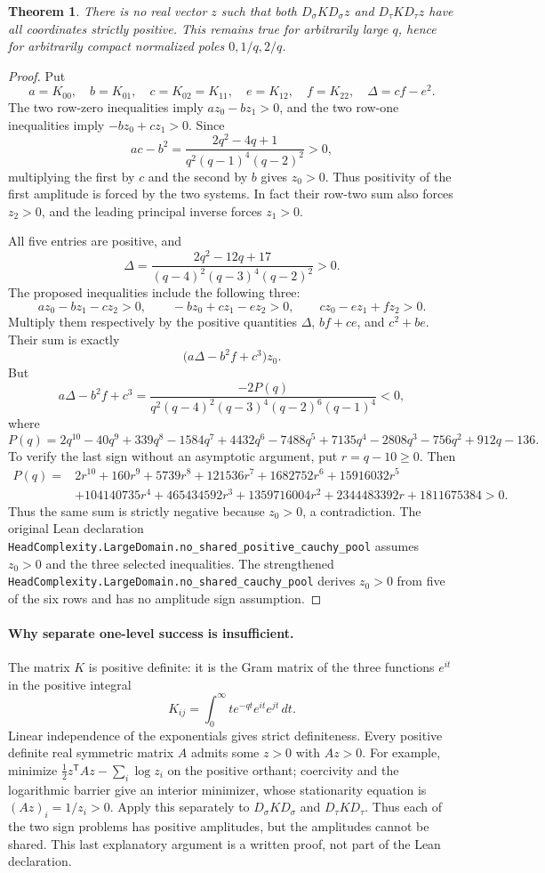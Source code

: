 \documentclass{article}
\newtheorem{theorem}{Theorem}
\begin{document}
\begin{theorem}
There is no real vector $z$ such that both
$D_\sigma K D_\sigma z$ and $D_\tau K D_\tau z$ have all coordinates
strictly positive. This remains true for arbitrarily large $q$, hence
for arbitrarily compact normalized poles $0,1/q,2/q$.
\end{theorem}
\begin{proof}
Put
\[
 a=K_{00},\quad b=K_{01},\quad c=K_{02}=K_{11},
 \quad e=K_{12},\quad f=K_{22},\quad\Delta=cf-e^2.
\]
The two row-zero inequalities imply $az_0-bz_1>0$, and the two
row-one inequalities imply $-bz_0+cz_1>0$. Since
\[
 ac-b^2=\frac{2q^2-4q+1}{q^2(q-1)^4(q-2)^2}>0,
\]
multiplying the first by $c$ and the second by $b$ gives $z_0>0$.
Thus positivity of the first amplitude is forced by the two systems.
In fact their row-two sum also forces $z_2>0$, and the leading
principal inverse forces $z_1>0$.

All five entries are positive, and
\[
 \Delta=\frac{2q^2-12q+17}{(q-4)^2(q-3)^4(q-2)^2}>0.
\]
The proposed inequalities include the following three:
\[
 az_0-bz_1-cz_2>0,\qquad
 -bz_0+cz_1-ez_2>0,\qquad
 cz_0-ez_1+fz_2>0.
\]
Multiply them respectively by the positive quantities
$\Delta$, $bf+ce$, and $c^2+be$. Their sum is exactly
\[
 \bigl(a\Delta-b^2f+c^3\bigr)z_0.
\]
But
\[
 a\Delta-b^2f+c^3=
 \frac{-2P(q)}{q^2(q-4)^2(q-3)^4(q-2)^6(q-1)^4}<0,
\]
where
\[
 P(q)=2q^{10}-40q^9+339q^8-1584q^7+4432q^6-7488q^5
       +7135q^4-2808q^3-756q^2+912q-136.
\]
To verify the last sign without an asymptotic argument, put $r=q-10\geq0$.
Then
\[
\begin{split}
 P(q)={}&2r^{10}+160r^9+5739r^8+121536r^7+1682752r^6
 +15916032r^5\\
 &+104140735r^4+465434592r^3+1359716004r^2
 +2344483392r+1811675384>0.
\end{split}
\]
Thus the same sum is strictly negative because $z_0>0$, a contradiction.
The original Lean declaration
\texttt{HeadComplexity.LargeDomain.no\_shared\_positive\_cauchy\_pool}
assumes $z_0>0$ and the three selected inequalities. The strengthened
\texttt{HeadComplexity.LargeDomain.no\_shared\_cauchy\_pool}
derives $z_0>0$ from five of the six rows and has no amplitude sign
assumption.
\end{proof}

\paragraph{Why separate one-level success is insufficient.}
The matrix $K$ is positive definite: it is the Gram matrix of the three
functions $e^{it}$ in the positive integral
\[
 K_{ij}=\int_0^\infty t e^{-qt}e^{it}e^{jt}\,dt.
\]
Linear independence of the exponentials gives strict definiteness.
Every positive definite real symmetric matrix $A$ admits some $z>0$
with $Az>0$. For example, minimize
$\frac12z^{\mathsf T}Az-\sum_i\log z_i$ on the positive orthant;
coercivity and the logarithmic barrier give an interior minimizer, whose
stationarity equation is $(Az)_i=1/z_i>0$.
Apply this separately to $D_\sigma K D_\sigma$ and
$D_\tau K D_\tau$. Thus each of the two sign problems has positive
amplitudes, but the amplitudes cannot be shared. This last explanatory
argument is a written proof, not part of the Lean declaration.
\end{document}
